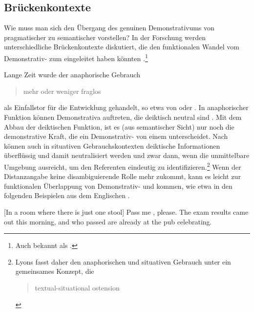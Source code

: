 \subsection{Brückenkontexte} \label{sec:bruecke}

Wie muss man sich den Übergang des genuinen Demonstrativums  von pragmatischer  zu semantischer    vorstellen? In der Forschung werden unterschiedliche Brückenkontexte  \parencite{Heine2002} diskutiert, die den funktionalen Wandel vom Demonstrativ-  zum  eingeleitet haben könnten \parencite[zur Übersicht s.][526--528]{deMulder2011}.\footnote{Auch bekannt als  \parencite{Diewald2002}.}

Lange Zeit wurde der anaphorische  Gebrauch  \blockcquote[93]{Himmelmann1997}{mehr oder weniger fraglos} als Einfallstor für die Entwicklung gehandelt, so etwa von  \textcite{Oubouzar1989,Oubouzar1992} oder \textcite{Diessel1999}. In anaphorischer  Funktion können Demonstrativa  auftreten, die deiktisch neutral sind \parencite[41]{Lehmann2015}. Mit dem Abbau der deiktischen Funktion, ist es (aus semantischer Sicht) nur noch die demonstrative Kraft, die ein Demonstrativ-  von einem  unterscheidet. Nach \textcite[331--334]{Lyons1999} können auch in situativen  Gebrauchskontexten deiktische Informationen überflüssig und damit neutralisiert werden und zwar dann, wenn die unmittelbare Umgebung ausreicht, um den Referenten eindeutig zu identifizieren.\footnote{Lyons fasst daher den anaphorischen  und situativen  Gebrauch unter ein gemeinsames Konzept, die  \blockcquote[161]{Lyons1999}{textual-situational ostension}.} Wenn der Distanzangabe keine disambiguierende Rolle mehr zukommt, kann es leicht zur funktionalen Überlappung von Demonstrativ-  und  kommen, wie etwa in den folgenden Beispielen aus dem Englischen \parencite[164]{Lyons1999}.\largerpage[2]


 \begin{exe}
	\ex 
	\begin{xlist} \label{ex:lyons}
		\ex \label{ex:lyons-sit}  [In a room where there is just one stool] Pass me , please.  
		\ex \label{ex:lyons-ana} The exam results came out this morning, and  who passed are already at the pub celebrating.  
		\end{xlist}
\end{exe}

